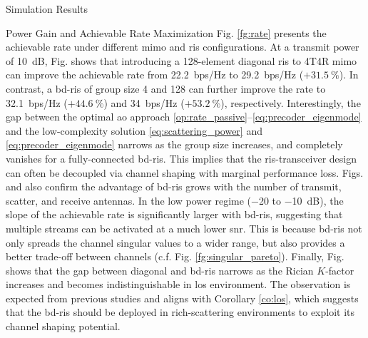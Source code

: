 \documentclass[journal]{IEEEtran}
\begin{document}
\begin{section}{Simulation Results}
\begin{subsection}{Power Gain and Achievable Rate Maximization}
		Fig. \ref{fg:rate} presents the achievable rate under different \gls{mimo} and \gls{ris} configurations.
		At a transmit power of \qty{10}{dB}, Fig.  shows that introducing a 128-element diagonal \gls{ris} to 4T4R \gls{mimo} can improve the achievable rate from \qty{22.2}{bps/Hz} to \qty{29.2}{bps/Hz} ($+\qty{31.5}{\percent}$).
		In contrast, a \gls{bd}-\gls{ris} of group size 4 and 128 can further improve the rate to \qty{32.1}{bps/Hz} ($+\qty{44.6}{\percent}$) and \qty{34}{bps/Hz}  ($+\qty{53.2}{\percent}$), respectively.
		Interestingly, the gap between the optimal \gls{ao} approach \eqref{op:rate_passive}--\eqref{eq:precoder_eigenmode} and the low-complexity solution \eqref{eq:scattering_power} and \eqref{eq:precoder_eigenmode} narrows as the group size increases, and completely vanishes for a fully-connected \gls{bd}-\gls{ris}.
		This implies that the \gls{ris}-transceiver design can often be decoupled via channel shaping with marginal performance loss.
		Figs.  and  also confirm the advantage of \gls{bd}-\gls{ris} grows with the number of transmit, scatter, and receive antennas.
		In the low power regime (\num{-20} to \qty{-10}{dB}), the slope of the achievable rate is significantly larger with \gls{bd}-\gls{ris}, suggesting that multiple streams can be activated at a much lower \gls{snr}.
		This is because \gls{bd}-\gls{ris} not only spreads the channel singular values to a wider range, but also provides a better trade-off between channels (c.f. Fig. \ref{fg:singular_pareto}).
		Finally, Fig.  shows that the gap between diagonal and \gls{bd}-\gls{ris} narrows as the Rician $K$-factor increases and becomes indistinguishable in \gls{los} environment.
		The observation is expected from previous studies \cite{Shen2020a,Li2023b,Nerini2023} and aligns with Corollary \ref{co:los}, which suggests that the \gls{bd}-\gls{ris} should be deployed in rich-scattering environments to exploit its channel shaping potential.
	\end{subsection}
\end{section}
\end{document}
